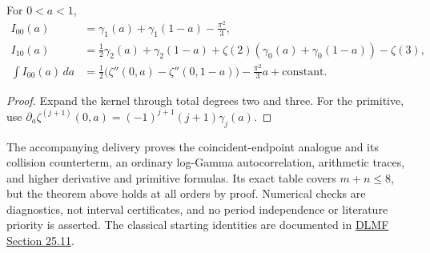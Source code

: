 \begin{corollary}
\label{corrclosure:examples}
For $0<a<1$,
\begin{align*}
 I_{00}(a)&=\gamma_1(a)+\gamma_1(1-a)-\frac{\pi^2}{3},\\
 I_{10}(a)&=\tfrac12\gamma_2(a)+\gamma_2(1-a)
        +\zeta(2)(\gamma_0(a)+\gamma_0(1-a))-\zeta(3),\\
 \int I_{00}(a)\,da
 &=\tfrac12\bigl(\zeta''(0,a)-\zeta''(0,1-a)\bigr)
                         -\frac{\pi^2}3a+\text{constant}.
\end{align*}
\end{corollary}
\begin{proof}
Expand the kernel through total degrees two and three. For the
primitive, use
$\partial_a\zeta^{(j+1)}(0,a)=(-1)^{j+1}(j+1)\gamma_j(a)$.
\end{proof}

\begin{remark}
The accompanying delivery proves the coincident-endpoint analogue and
its collision counterterm, an ordinary log-Gamma autocorrelation,
arithmetic traces, and higher derivative and primitive formulas.
Its exact table covers $m+n\le8$, but the theorem above holds at all
orders by proof. Numerical checks are diagnostics, not interval
certificates, and no period independence or literature priority is
asserted. The classical starting identities are documented in
\href{https://dlmf.nist.gov/25.11}{DLMF Section 25.11}.
\end{remark}
